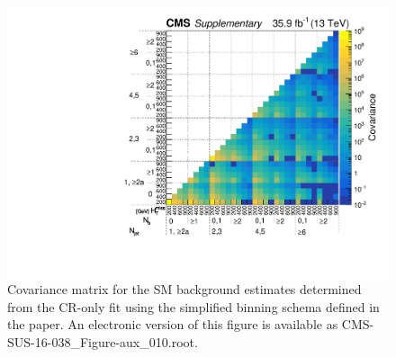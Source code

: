 \clearpage
\begin{figure}
  \centering
  \includegraphics[width=\textwidth]{Supplementary/CMS-SUS-16-038_Figure-aux_010}
  \caption{Covariance matrix for the SM background estimates
    determined from the CR-only fit using the simplified binning
	schema defined in the paper.
	An electronic version of this figure is available as CMS-SUS-16-038\_Figure-aux\_010.root.
	} %
  \label{fig:covariance_aux}
\end{figure} 
\clearpage

